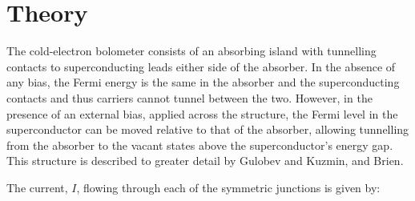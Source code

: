 \documentclass[final]{svjour2}
\begin{document}
\section{Theory}
The cold-electron bolometer consists of an absorbing island with tunnelling contacts to superconducting leads either side of the absorber. In the absence of any bias, the Fermi energy is the same in the absorber and the superconducting contacts and thus carriers cannot tunnel between the two. However, in the presence of an external bias, applied across the structure, the Fermi level in the superconductor can be moved relative to that of the absorber, allowing tunnelling from the absorber to the vacant states above the superconductor's energy gap. This structure is described to greater detail by Gulobev and Kuzmin, and Brien.\cite{Golubev2001,Brien2014}%
\par 
The current, $I$, flowing through each of the symmetric junctions is given by:
\end{document}
